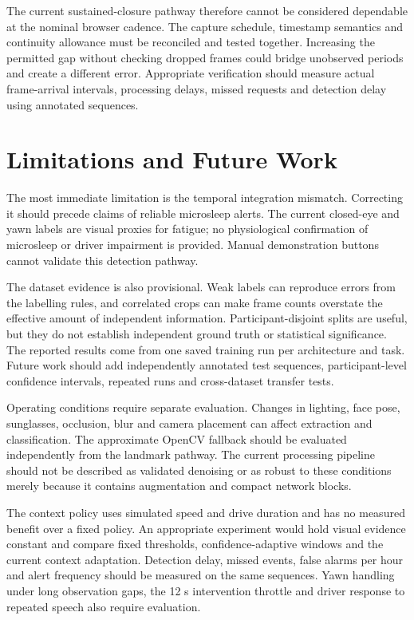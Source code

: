 \documentclass[pdflatex,sn-mathphys-num]{sn-jnl}
\begin{document}
The current sustained-closure pathway therefore cannot be considered dependable at the nominal browser cadence. The capture schedule, timestamp semantics and continuity allowance must be reconciled and tested together. Increasing the permitted gap without checking dropped frames could bridge unobserved periods and create a different error. Appropriate verification should measure actual frame-arrival intervals, processing delays, missed requests and detection delay using annotated sequences.

\FloatBarrier
\section{Limitations and Future Work}\label{sec:limits}
The most immediate limitation is the temporal integration mismatch. Correcting it should precede claims of reliable microsleep alerts. The current closed-eye and yawn labels are visual proxies for fatigue; no physiological confirmation of microsleep or driver impairment is provided. Manual demonstration buttons cannot validate this detection pathway.

The dataset evidence is also provisional. Weak labels can reproduce errors from the labelling rules, and correlated crops can make frame counts overstate the effective amount of independent information. Participant-disjoint splits are useful, but they do not establish independent ground truth or statistical significance. The reported results come from one saved training run per architecture and task. Future work should add independently annotated test sequences, participant-level confidence intervals, repeated runs and cross-dataset transfer tests.

Operating conditions require separate evaluation. Changes in lighting, face pose, sunglasses, occlusion, blur and camera placement can affect extraction and classification. The approximate OpenCV fallback should be evaluated independently from the landmark pathway. The current processing pipeline should not be described as validated denoising or as robust to these conditions merely because it contains augmentation and compact network blocks.

The context policy uses simulated speed and drive duration and has no measured benefit over a fixed policy. An appropriate experiment would hold visual evidence constant and compare fixed thresholds, confidence-adaptive windows and the current context adaptation. Detection delay, missed events, false alarms per hour and alert frequency should be measured on the same sequences. Yawn handling under long observation gaps, the 12 s intervention throttle and driver response to repeated speech also require evaluation.
\end{document}
